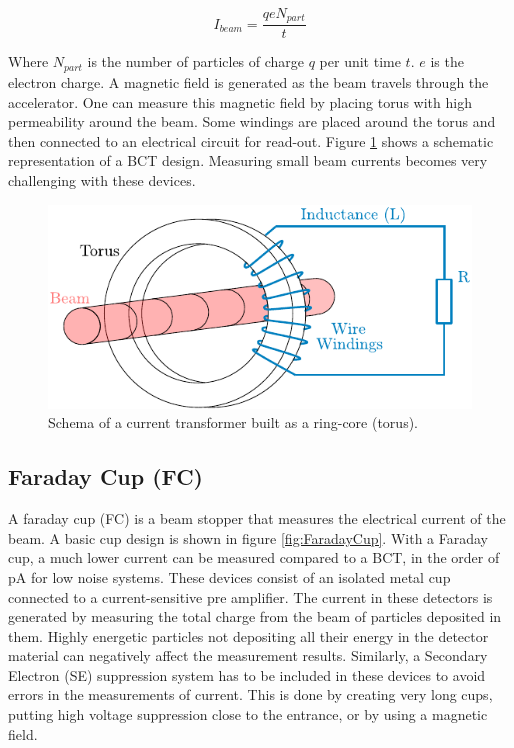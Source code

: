 \begin{equation}
    I_{beam} = \frac{q e N_{part}}{t}
\end{equation}

Where $N_{part}$ is the number of particles of charge $q$ per unit time $t$. $e$ is the electron charge. A magnetic field is generated as the beam travels through the accelerator. One can measure this magnetic field by placing torus with high permeability around the beam. Some windings are placed around the torus and then connected to an electrical circuit for read-out. Figure \ref{fig:BCTschema} shows a schematic representation of a BCT design. Measuring small beam currents becomes very challenging with these devices.

\begin{figure}[h]
    \centering
    \includegraphics[width=0.6\columnwidth]{BCTschema/BCTschema.pdf}
    \caption{Schema of a current transformer built as a ring-core (torus). }
    \label{fig:BCTschema}
\end{figure}

\subsection{Faraday Cup (FC)}
\label{sec:FC}

A faraday cup (FC) is a beam stopper that measures the electrical current of the beam. A basic cup design is shown in figure \ref{fig:FaradayCup}. With a Faraday cup, a much lower current can be measured compared to a BCT, in the order of \si[]{\pico \ampere} for low noise systems. These devices consist of an isolated metal cup connected to a current-sensitive pre amplifier. The current in these detectors is generated by measuring the total charge from the beam of particles deposited in them. Highly energetic particles not depositing all their energy in the detector material can negatively affect the measurement results. Similarly, a Secondary Electron (SE) suppression system has to be included in these devices to avoid errors in the measurements of current. This is done by creating very long cups, putting high voltage suppression close to the entrance, or by using a magnetic field. 

